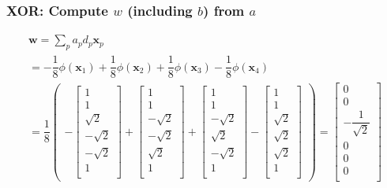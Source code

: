 \documentclass[12pt,notes,mathserif]{beamer}
\begin{document}
\begin{frame}[c]
\frametitle{XOR: Compute $w$ (including $b$) from $a$}
\begin{gather*}
\mathbf{w}=\sum_pa_pd_p\mathbf{x}_p\\
=
-\dfrac18\phi(\mathbf{x}_1)
+\dfrac18\phi(\mathbf{x}_2)
+\dfrac18\phi(\mathbf{x}_3)
-\dfrac18\phi(\mathbf{x}_4)\\
=\dfrac{1}{8}
\begin{pmatrix}
-\begin{bmatrix}
1\\
1\\
\sqrt2\\
-\sqrt2\\
-\sqrt2\\
1\\
\end{bmatrix}
+\begin{bmatrix}
1\\
1\\
-\sqrt2\\
-\sqrt2\\
\sqrt2\\
1\\
\end{bmatrix}
+\begin{bmatrix}
1\\
1\\
-\sqrt2\\
\sqrt2\\
-\sqrt2\\
1\\
\end{bmatrix}
-\begin{bmatrix}
1\\
1\\
\sqrt2\\
\sqrt2\\
\sqrt2\\
1\\
\end{bmatrix}
\end{pmatrix}=
\begin{bmatrix}
0\\
0\\
-\dfrac{1}{\sqrt2}\\
0\\
0\\
0\\
\end{bmatrix}
\end{gather*}
\end{frame}
\end{document}
